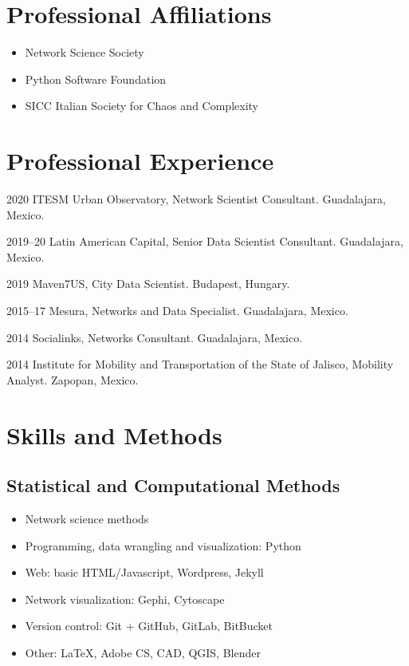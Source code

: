 \documentclass{academiccv}
\begin{document}
\section*{Professional Affiliations}
\begin{itemize}
	\item Network Science Society
	\item Python Software Foundation
	\item SICC Italian Society for Chaos and Complexity
\end{itemize}


\section*{Professional Experience}
\begin{tablist}
	\item[2020] \tab ITESM Urban Observatory, Network Scientist Consultant. Guadalajara, Mexico. 
	\item[2019--20] \tab Latin American Capital, Senior Data Scientist Consultant. Guadalajara, Mexico.
	\item[2019] \tab Maven7US, City Data Scientist. Budapest, Hungary.
	\item[2015--17] \tab Mesura, Networks and Data Specialist. Guadalajara, Mexico.
	\item[2014] \tab Socialinks, Networks Consultant. Guadalajara, Mexico.
	\item[2014] \tab Institute for Mobility and Transportation of the State of Jalisco, Mobility Analyst. Zapopan, Mexico.
\end{tablist}


\section*{Skills and Methods}
\subsection*{Statistical and Computational Methods}
\begin{itemize}
	\item Network science methods
	\item Programming, data wrangling and visualization: Python
	\item Web: basic HTML/Javascript, Wordpress, Jekyll
	\item Network visualization: Gephi, Cytoscape
	\item Version control: Git +  {GitHub, GitLab, BitBucket}
	\item Other: \LaTeX, Adobe CS, CAD, QGIS, Blender
\end{itemize}
\end{document}
